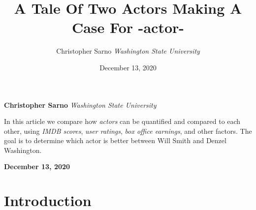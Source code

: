\documentclass[]{article}
\title{\textbf{\textcolor{WSU.crimson}{A Tale Of Two
Actors}} \newline \textbf{\textcolor{WSU.gray}{Making A Case For
-actor-}}  }
\author{\Large Christopher
Sarno\vspace{0.05in} \newline\normalsize\emph{Washington State
University}  }
\date{December 13, 2020}
\newcommand*{\authorfont}{\fontfamily{phv}\selectfont}
\renewenvironment{abstract}
 {{%
    \setlength{\leftmargin}{0mm}
    \setlength{\rightmargin}{\leftmargin}%
  }%
  \relax}
 {\endlist}
\begin{document}
	
%    


{%
\setlength{\parindent}{0pt}
\thispagestyle{plain}
{\fontsize{18}{20}\selectfont\raggedright 
\maketitle  %

}

{
   \vskip 13.5pt\relax \normalsize\fontsize{11}{12} 
   
\textbf{\authorfont Christopher
Sarno} \hskip 15pt \emph{\small Washington State University}   

}

}








\begin{abstract}

    \hbox{\vrule height .2pt width 39.14pc}

    \vskip 8.5pt %

\noindent In this article we compare how \emph{actors} can be quantified
and compared to each other, using \emph{IMDB scores},
\emph{user ratings}, \emph{box office earnings}, and other factors. The
goal is to determine which actor is better between Will Smith and Denzel
Washington. \vspace{0.25in}


    



    
    \hbox{\vrule height .2pt width 39.14pc}
    \vskip 5pt 
    \hfill \textbf{\textcolor{WSU.gray}{ December 13, 2020 } }
    \vskip 5pt 
    
\end{abstract}


\vskip -8.5pt




\noindent  

\newpage

\section{Introduction}
\label{sec:intro}
\end{document}

